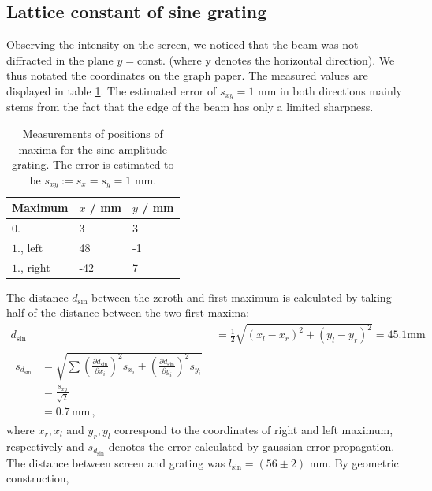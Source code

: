 \subsection{Lattice constant of sine grating}
Observing the intensity on the screen, we noticed that the beam was not 
diffracted in the plane $y = \mathrm{const.}$ (where y denotes the horizontal direction). 
We thus notated the coordinates on the graph paper. The measured values 
are displayed in table \ref{tab:sine_distances}. The estimated error of 
$s_{xy} = 1$ mm in both directions mainly stems from the fact that the edge of the beam 
has only a limited sharpness. 
\renewcommand{\arraystretch}{1.5}
\begin{table}[htdp]
    \centering
    \begin{tabular}{|p{6.18cm}|p{3.82cm}|p{3.82cm}|}
        \hline
        \rowcolor{tabcolor}
        Maximum & $x$ / mm & $y$  / mm \\ \hline
        $0.$        & 3     & 3\\
        $1.$, left & 48    & -1\\
        $1.$, right  & -42   & 7\\
        \hline
    \end{tabular}
    \caption{
        Measurements of positions of maxima for the sine amplitude grating. 
        The error is estimated to be $s_{xy} := s_x = s_y = 1$ mm. 
        }
    \label{tab:sine_distances}
\end{table}
The distance $d_\mathrm{sin}$ between the zeroth and first maximum is calculated by taking half of 
the distance between the two first maxima:
\begin{align}
    d_\mathrm{sin}   &= \frac{1}{2} \sqrt{(x_l - x_r)^2 + (y_l - y_r)^2} = 45.1 \mathrm{mm} \\
    \begin{split}
        s_{d_\mathrm{sin}} &= \sqrt{\sum{
                \left(\frac{\partial d_\mathrm{sin}}{\partial x_i}\right)^2 s_{x_i}  + 
                \left(\frac{\partial d_\mathrm{sin}}{\partial y_i}\right)^2 s_{y_i} 
                }} \\
        &= \frac{s_{xy}}{\sqrt{2}} \\
        &= 0.7 \, \mathrm{mm}\, ,
    \end{split}
\end{align}
where $x_r, x_l$ and $y_r, y_l$ correspond to the coordinates of right and left 
maximum, respectively and $s_{d_\mathrm{sin}}$ denotes the error calculated by gaussian error propagation.
The distance between screen and grating was $l_\mathrm{sin} = (56 \pm 2)$ mm. By geometric construction, 
